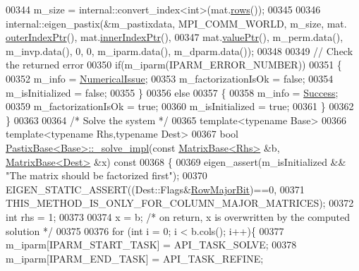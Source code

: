 \begin{DoxyCode}
00344   m\_size = internal::convert\_index<int>(mat.\hyperlink{group___sparse_core___module_a62e61bb861eee306d5b069ce652b5aa5}{rows}());
00345   
00346   internal::eigen\_pastix(&m\_pastixdata, MPI\_COMM\_WORLD, m\_size, mat.
      \hyperlink{group___sparse_core___module_a75506964d86d6badb32d0b4917acf2e2}{outerIndexPtr}(), mat.\hyperlink{group___sparse_core___module_ae7b804bd39745156d20ca1611a296b67}{innerIndexPtr}(),
00347                mat.\hyperlink{group___sparse_core___module_a9d4354d3f4d121d764bbed33cac05329}{valuePtr}(), m\_perm.data(), m\_invp.data(), 0, 0, m\_iparm.data(), m\_dparm.data());
00348   
00349   \textcolor{comment}{// Check the returned error}
00350   \textcolor{keywordflow}{if}(m\_iparm(IPARM\_ERROR\_NUMBER))
00351   \{
00352     m\_info = \hyperlink{group__enums_gga85fad7b87587764e5cf6b513a9e0ee5eaaf9b736d310a664e7729d163a035cc5f}{NumericalIssue};
00353     m\_factorizationIsOk = \textcolor{keyword}{false};
00354     m\_isInitialized = \textcolor{keyword}{false};
00355   \}
00356   \textcolor{keywordflow}{else}
00357   \{
00358     m\_info = \hyperlink{group__enums_gga85fad7b87587764e5cf6b513a9e0ee5ea52581b035f4b59c203b8ff999ef5fcea}{Success};
00359     m\_factorizationIsOk = \textcolor{keyword}{true};
00360     m\_isInitialized = \textcolor{keyword}{true};
00361   \}
00362 \}
00363 
00364 \textcolor{comment}{/* Solve the system */}
00365 \textcolor{keyword}{template}<\textcolor{keyword}{typename} Base>
00366 \textcolor{keyword}{template}<\textcolor{keyword}{typename} Rhs,\textcolor{keyword}{typename} Dest>
00367 \textcolor{keywordtype}{bool} \hyperlink{class_eigen_1_1_pastix_base}{PastixBase<Base>::\_solve\_impl}(\textcolor{keyword}{const} 
      \hyperlink{group___core___module_class_eigen_1_1_matrix_base}{MatrixBase<Rhs>} &b, \hyperlink{group___core___module_class_eigen_1_1_matrix_base}{MatrixBase<Dest>} &x)\textcolor{keyword}{ const}
00368 \textcolor{keyword}{}\{
00369   eigen\_assert(m\_isInitialized && \textcolor{stringliteral}{"The matrix should be factorized first"});
00370   EIGEN\_STATIC\_ASSERT((Dest::Flags&\hyperlink{group__flags_gae4f56c2a60bbe4bd2e44c5b19cbe8762}{RowMajorBit})==0,
00371                      THIS\_METHOD\_IS\_ONLY\_FOR\_COLUMN\_MAJOR\_MATRICES);
00372   \textcolor{keywordtype}{int} rhs = 1;
00373   
00374   x = b; \textcolor{comment}{/* on return, x is overwritten by the computed solution */}
00375   
00376   \textcolor{keywordflow}{for} (\textcolor{keywordtype}{int} i = 0; i < b.cols(); i++)\{
00377     m\_iparm[IPARM\_START\_TASK]          = API\_TASK\_SOLVE;
00378     m\_iparm[IPARM\_END\_TASK]            = API\_TASK\_REFINE;

\end{DoxyCode}
